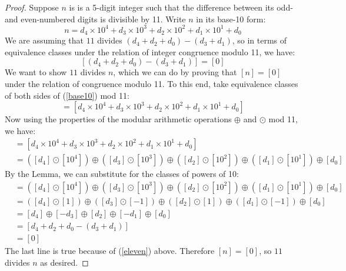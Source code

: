 \documentclass[11pt]{article}
\begin{document}
\begin{proof}
	Suppose $n$ is is a 5-digit integer such that the difference between its odd- and even-numbered digits is divisible by 11. Write $n$ in its base-10 form: 
	\begin{equation}\label{base10}
		n = d_4 \times 10^4 + d_3 \times 10^3 + d_2 \times 10^2 + d_1 \times 10^1 + d_0 		
	\end{equation}
We are assuming that $11$ divides $(d_4 + d_2 + d_0) - (d_3 + d_1)$, so in terms of equivalence classes under the relation of integer congruence modulo 11, we have:  
	\begin{equation}\label{eleven}
		[(d_4 + d_2 + d_0) - (d_3 + d_1)] = [0]
	\end{equation}
We want to show $11$ divides $n$, which we can do by proving that $[n] = [0]$ under the relation of congruence modulo 11. To this end, take equivalence classes of both sides of (\ref{base10}) mod 11: 
	\begin{equation*}
		[n] = [d_4 \times 10^4 + d_3 \times 10^3 + d_2 \times 10^2 + d_1 \times 10^1 + d_0]
	\end{equation*}
Now using the properties of the modular arithmetic operations $\oplus$ and $\odot$ mod 11, we have: 
\begin{align*}
	[n] &= [d_4 \times 10^4 + d_3 \times 10^3 + d_2 \times 10^2 + d_1 \times 10^1 + d_0] \\
	&= ([d_4] \odot [10^4]) \oplus ([d_3] \odot [10^3]) \oplus ([d_2] \odot [10^2]) \oplus ([d_1] \odot [10^1]) \oplus [d_0] 
\end{align*}
By the Lemma, we can substitute for the classes of powers of 10: 
\begin{align*}
	[n] &= ([d_4] \odot [10^4]) \oplus ([d_3] \odot [10^3]) \oplus ([d_2] \odot [10^2]) \oplus ([d_1] \odot [10^1]) \oplus [d_0] \\
	&= ([d_4] \odot [1]) \oplus ([d_3] \odot [-1]) \oplus ([d_2] \odot [1]) \oplus ([d_1] \odot [-1]) \oplus [d_0] \\
	&= [d_4] \oplus [-d_3] \oplus [d_2] \oplus [-d_1] \oplus [d_0] \\ 
	&= [d_4 + d_2 + d_0 - (d_3 + d_1)] \\
	&= [0]
\end{align*}
The last line is true because of (\ref{eleven}) above. Therefore $[n] = [0]$, so $11$ divides $n$ as desired. 
\end{proof}
\end{document}
